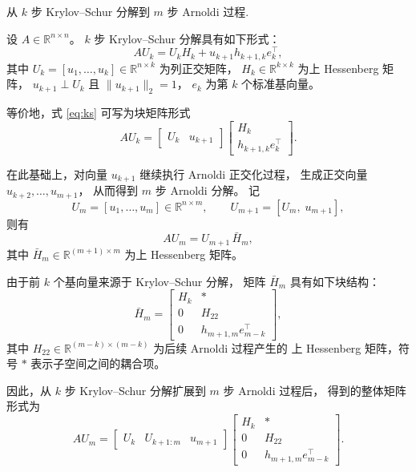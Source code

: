 \documentclass{ctexart}
\newif\ifpreface
\begin{document}
\large
\setlength{\baselineskip}{1.2em}
\ifpreface
    
\newgeometry{left=2cm,right=2cm,top=2cm,bottom=2cm}
\else
{}
\maketitle
\fi
\begin{problem} 
从 $k$ 步 Krylov--Schur 分解到 $m$ 步 Arnoldi 过程.
\end{problem}
\begin{solution}
设 $A\in\mathbb{R}^{n\times n}$。
$k$ 步 Krylov--Schur 分解具有如下形式：
\begin{equation}
A U_k = U_k H_k + u_{k+1} h_{k+1,k} e_k^{\top},
\label{eq:ks}
\end{equation}
其中
$U_k=[u_1,\dots,u_k]\in\mathbb{R}^{n\times k}$ 为列正交矩阵，
$H_k\in\mathbb{R}^{k\times k}$ 为上 Hessenberg 矩阵，
$u_{k+1}\perp U_k$ 且 $\|u_{k+1}\|_2=1$，
$e_k$ 为第 $k$ 个标准基向量。

等价地，式 \eqref{eq:ks} 可写为块矩阵形式
\begin{equation}
A U_k
=
\begin{bmatrix}
U_k & u_{k+1}
\end{bmatrix}
\begin{bmatrix}
H_k \\[1mm]
h_{k+1,k} e_k^{\top}
\end{bmatrix}.
\end{equation}

在此基础上，对向量 $u_{k+1}$ 继续执行 Arnoldi 正交化过程，
生成正交向量 $u_{k+2},\dots,u_{m+1}$，
从而得到 $m$ 步 Arnoldi 分解。
记
\[
U_m = [u_1,\dots,u_m]\in\mathbb{R}^{n\times m},
\qquad
U_{m+1}=[U_m,\;u_{m+1}],
\]
则有
\begin{equation}
A U_m = U_{m+1}\,\bar H_m,
\label{eq:arnoldi}
\end{equation}
其中 $\bar H_m\in\mathbb{R}^{(m+1)\times m}$ 为上 Hessenberg 矩阵。

由于前 $k$ 个基向量来源于 Krylov--Schur 分解，
矩阵 $\bar H_m$ 具有如下块结构：
\begin{equation}
\bar H_m =
\begin{bmatrix}
H_k & * \\
0   & H_{22} \\
0   & h_{m+1,m} e_{m-k}^{\top}
\end{bmatrix},
\end{equation}
其中 $H_{22}\in\mathbb{R}^{(m-k)\times(m-k)}$ 为后续 Arnoldi 过程产生的
上 Hessenberg 矩阵，符号 $*$ 表示子空间之间的耦合项。

因此，从 $k$ 步 Krylov--Schur 分解扩展到 $m$ 步 Arnoldi 过程后，
得到的整体矩阵形式为
\begin{equation}
A U_m
=
\begin{bmatrix}
U_k & U_{k+1:m} & u_{m+1}
\end{bmatrix}
\begin{bmatrix}
H_k & * \\
0   & H_{22} \\
0   & h_{m+1,m} e_{m-k}^{\top}
\end{bmatrix}.
\end{equation}
\end{solution}
\end{document}
